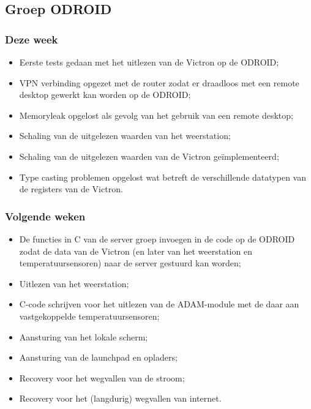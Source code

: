 \subsection*{Groep ODROID}
\subsubsection*{Deze week}
\begin{itemize}
\item Eerste tests gedaan met het uitlezen van de Victron op de ODROID;
\item VPN verbinding opgezet met de router zodat er draadloos met een remote desktop gewerkt kan worden op de ODROID;
\item Memoryleak opgelost als gevolg van het gebruik van een remote desktop;
\item Schaling van de uitgelezen waarden van het weerstation;
\item Schaling van de uitgelezen waarden van de Victron ge\"implementeerd;
\item Type casting problemen opgelost wat betreft de verschillende datatypen van de registers van de Victron.
\end{itemize}

\subsubsection*{Volgende weken}
\begin{itemize}
\item De functies in C van de server groep invoegen in de code op de ODROID zodat de data van de Victron (en later van het weerstation en temperatuursensoren) naar de server gestuurd kan worden;
\item Uitlezen van het weerstation;
\item C-code schrijven voor het uitlezen van de ADAM-module met de daar aan vastgekoppelde temperatuursensoren;
\item Aansturing van het lokale scherm;
\item Aansturing van de launchpad en opladers;
\item Recovery voor het wegvallen van de stroom;
\item Recovery voor het (langdurig) wegvallen van internet.
\end{itemize}